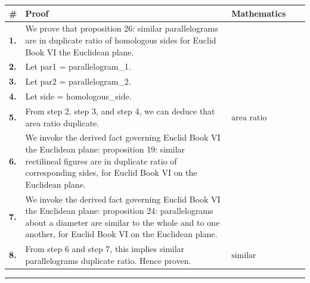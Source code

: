 \documentclass[11pt]{article}
\theoremstyle{definition}
\begin{document}
\begin{tabular}{@{} >{\raggedright\arraybackslash}p{} >{\raggedright\arraybackslash}p{} >{\raggedleft\arraybackslash}p{} @{}}
\textbf{\#} & \textbf{Proof} & \textbf{Mathematics} \\
\midrule
\textbf{1.} & We prove that proposition 26: similar parallelograms are in duplicate ratio of homologous sides for Euclid Book VI the Euclidean plane. & \\[0.45em]
\textbf{2.} & Let par1 = parallelogram\_1. & \\[0.45em]
\textbf{3.} & Let par2 = parallelogram\_2. & \\[0.45em]
\textbf{4.} & Let side = homologous\_side. & \\[0.45em]
\textbf{5.} & From step 2, step 3, and step 4, we can deduce that area ratio duplicate. & $\displaystyle \text{area ratio duplicate}$ \\[0.45em]
\textbf{6.} & We invoke the derived fact governing Euclid Book VI the Euclidean plane: proposition 19: similar rectilineal figures are in duplicate ratio of corresponding sides, for Euclid Book VI on the Euclidean plane. & \\[0.45em]
\textbf{7.} & We invoke the derived fact governing Euclid Book VI the Euclidean plane: proposition 24: parallelograms about a diameter are similar to the whole and to one another, for Euclid Book VI on the Euclidean plane. & \\[0.45em]
\textbf{8.} & From step 6 and step 7, this implies similar parallelograms duplicate ratio. Hence proven. & $\displaystyle \text{similar parallelograms duplicate ratio}$ \\[0.45em]
\bottomrule
\end{tabular}
\label{thm:Geometry-Euclid Book VI-proposition_26_similar_parallelograms_are_in_duplicate_ratio_of_homologous_sides}
\par\medskip\hrule
\end{document}
